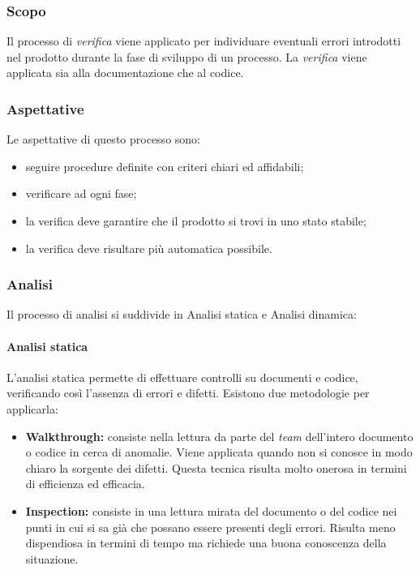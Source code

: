 			\subsubsection{Scopo}
				Il processo di \emph{verifica} viene applicato per individuare eventuali errori introdotti nel prodotto durante la fase di sviluppo di un processo. La \emph{verifica} viene applicata sia alla documentazione che al codice. %
			\subsubsection{Aspettative}
				Le aspettative di questo processo sono:
					\begin{itemize}
						\item seguire procedure definite con criteri chiari ed affidabili;
						\item verificare ad ogni fase;
						\item la verifica deve garantire che il prodotto si trovi in uno stato stabile;
						\item la verifica deve risultare più automatica possibile.
					\end{itemize}
				
				\subsubsection{Analisi}
					Il processo di analisi si suddivide in Analisi statica e Analisi dinamica:
						\paragraph*{Analisi statica}
						\aCapo{}  
							L'analisi statica permette di effettuare controlli su documenti e codice, verificando così l'assenza di errori e difetti. Esistono due metodologie per applicarla:
								\begin{itemize}
									\item \textbf{Walkthrough:} consiste nella lettura da parte del \emph{team} dell'intero documento o codice in cerca di anomalie. Viene applicata quando non si conosce in modo chiaro la sorgente dei difetti. Questa tecnica risulta molto onerosa in termini di efficienza ed efficacia.
									\item \textbf{Inspection:} consiste in una lettura mirata del documento o del codice nei punti in cui si sa già che possano essere presenti degli errori. Risulta meno dispendiosa in termini di tempo ma richiede una buona conoscenza della situazione.
								\end{itemize}
